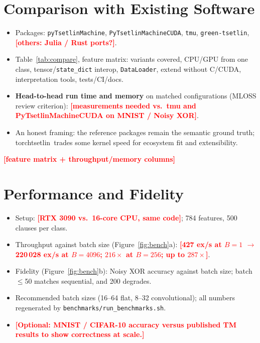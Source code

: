 \documentclass[twoside,11pt]{article}
\newcommand{\ph}[1]{\textcolor{red}{\textbf{[#1]}}}
\newenvironment{plan}{\begin{itemize}\color{gray}\small}{\end{itemize}}
\newcommand{\budget}[1]{\marginpar{\tiny\color{blue}#1}}
\newcommand{\code}[1]{\texttt{#1}}
\newcommand{\lib}{\textsf{torchtsetlin}}
\begin{document}
\section{Comparison with Existing Software}
\label{sec:comparison}
\budget{$\approx$0.6 p}
\begin{plan}
  \item Packages: \code{pyTsetlinMachine}, \code{PyTsetlinMachineCUDA}, \code{tmu}, \code{green-tsetlin}, \ph{others: Julia / Rust ports?}.
  \item Table~\ref{tab:compare}, feature matrix: variants covered, CPU/GPU from one class, tensor/\code{state\_dict} interop, \code{DataLoader}, extend without C/CUDA, interpretation tools, tests/CI/docs.
  \item \textbf{Head-to-head run time and memory} on matched configurations (MLOSS review criterion): \ph{measurements needed vs.\ tmu and PyTsetlinMachineCUDA on MNIST / Noisy XOR}.
  \item An honest framing: the reference packages remain the semantic ground truth; \lib\ trades some kernel speed for ecosystem fit and extensibility.
\end{plan}

\begin{table}[t]
  \centering\small
  \caption{\ph{Feature and performance comparison with existing TM software.}}
  \label{tab:compare}
  \ph{feature matrix + throughput/memory columns}
\end{table}

\section{Performance and Fidelity}
\label{sec:performance}
\budget{$\approx$0.6 p}
\begin{plan}
  \item Setup: \ph{RTX 3090 vs.\ 16-core CPU, same code}; 784 features, 500 clauses per class.
  \item Throughput against batch size (Figure~\ref{fig:bench}a): \ph{427 ex/s at $B{=}1$ $\rightarrow$ 220\,028 ex/s at $B{=}4096$; $216\times$ at $B{=}256$; up to $287\times$}.
  \item Fidelity (Figure~\ref{fig:bench}b): Noisy XOR accuracy against batch size; batch $\le$50 matches sequential, and 200 degrades.
  \item Recommended batch sizes (16--64 flat, 8--32 convolutional); all numbers regenerated by \code{benchmarks/run\_benchmarks.sh}.
  \item \ph{Optional: MNIST / CIFAR-10 accuracy versus published TM results to show correctness at scale.}
\end{plan}
\end{document}
